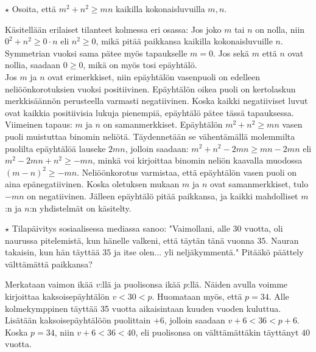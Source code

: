 \begin{tehtavasivu}
\begin{tehtava}
$\star$ Osoita, että $m^2+n^2 \geq mn$ kaikilla kokonaisluvuilla $m,n$.
		\begin{vastaus}
Käsitellään erilaiset tilanteet kolmessa eri osassa: 		
		Jos joko $m$ tai $n$ on nolla, niin $0^2+n^2 \geq 0\cdot n$ eli $n^2\geq 0$, mikä pitää paikkansa kaikilla kokonaisluvuille $n$. Symmetrian vuoksi sama pätee myös tapaukselle $m=0$. Jos sekä $m$ että $n$ ovat nollia, saadaan $0\geq 0$, mikä on myös tosi epäyhtälö. \\
		Jos $m$ ja $n$ ovat erimerkkiset, niin epäyhtälön vasenpuoli on edelleen neliöönkorotuksien vuoksi positiivinen. Epäyhtälön oikea puoli on kertolaskun merkkisäännön perusteella varmasti negatiivinen. Koska kaikki negatiiviset luvut ovat kaikkia positiivisia lukuja pienempiä, epäyhtälö pätee tässä tapauksessa. \\
		Viimeinen tapaus: $m$ ja $n$ on samanmerkkiset. Epäyhtälön $m^2+n^2 \geq mn$ vasen puoli muistuttaa binomin neliötä. Täydennetään se vähentämällä molemmilta puolilta epäyhtälöä lauseke $2mn$, jolloin saadaan: $m^2+n^2-2mn \geq mn-2mn$ eli $m^2-2mn+n^2 \geq -mn$, minkä voi kirjoittaa binomin neliön kaavalla muodossa $(m-n)^2 \geq -mn$. Neliöönkorotus varmistaa, että epäyhtälön vasen puoli on aina epänegatiivinen. Koska oletuksen mukaan $m$ ja $n$ ovat samanmerkkiset, tulo $-mn$ on negatiivinen. Jälleen epäyhtälö pitää paikkansa, ja kaikki mahdolliset $m$:n ja $n$:n yhdistelmät on käsitelty. 
		\end{vastaus}
\end{tehtava}

\begin{tehtava}
$\star$ Tilapäivitys sosiaalisessa mediassa sanoo: "Vaimollani, alle $30$ vuotta, oli naurussa pitelemistä, kun hänelle valkeni, että täytän tänä vuonna $35$. Nauran takaisin, kun hän täyttää $35$ ja itse olen... yli neljäkymmentä." Pitääkö päättely välttämättä paikkansa?
		\begin{vastaus}
		Merkataan vaimon ikää $v$:llä ja puolisonsa ikää $p$:llä. Näiden avulla voimme kirjoittaa kaksoisepäyhtälön $v<30<p$. Huomataan myös, että $p=34$. Alle kolmekymppinen täyttää 35 vuotta aikaisintaan kuuden vuoden kuluttua. Lisätään kaksoisepäyhtälöön puolittain $+6$, jolloin saadaan $v+6<36<p+6$. Koska $p=34$, niin $v+6<36<40$, eli puolisonsa on välttämättäkin täyttänyt $40$ vuotta.
		\end{vastaus}
\end{tehtava}


\end{tehtavasivu}
